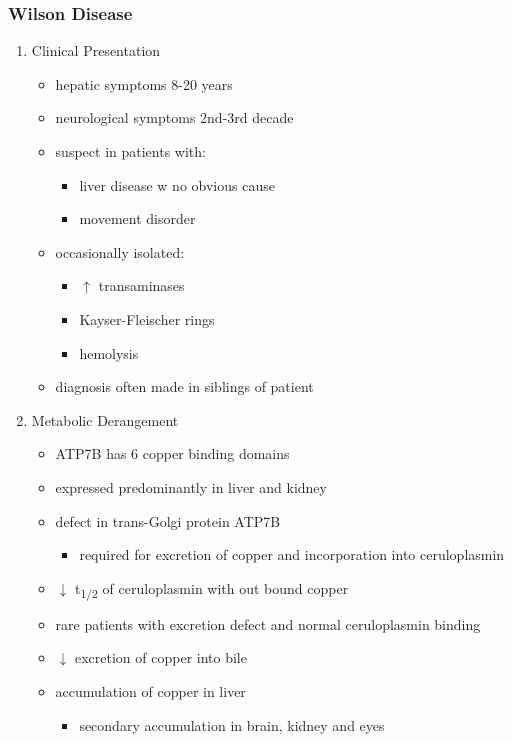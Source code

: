 \documentclass{scrartcl}
\begin{document}
\subsubsection{Wilson Disease}
\label{sec:orgb1a0b54}
\begin{enumerate}
\item Clinical Presentation
\label{sec:org8499922}
\begin{itemize}
\item hepatic symptoms 8-20 years
\item neurological symptoms 2nd-3rd decade
\item suspect in patients with:
\begin{itemize}
\item liver disease w no obvious cause
\item movement disorder
\end{itemize}
\item occasionally isolated:
\begin{itemize}
\item \(\uparrow\) transaminases
\item Kayser-Fleischer rings
\item hemolysis
\end{itemize}
\item diagnosis often made in siblings of patient
\end{itemize}

\item Metabolic Derangement
\label{sec:org8323e97}
\begin{itemize}
\item ATP7B has 6 copper binding domains
\item expressed predominantly in liver and kidney
\item defect in trans-Golgi protein ATP7B
\begin{itemize}
\item required for excretion of copper and incorporation into ceruloplasmin
\end{itemize}
\item \(\downarrow\) t\textsubscript{1/2} of ceruloplasmin with out bound copper
\item rare patients with excretion defect and normal ceruloplasmin binding
\item \(\downarrow\) excretion of copper into bile
\item accumulation of copper in liver
\begin{itemize}
\item secondary accumulation in brain, kidney and eyes
\end{itemize}
\end{itemize}


\end{enumerate}
\end{document}
